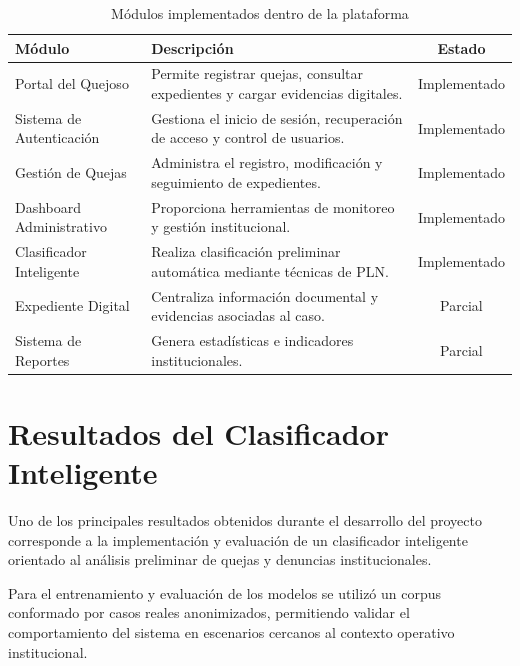 \begin{table}[H]
\centering
\caption{Módulos implementados dentro de la plataforma}
\label{tab:modulos_implementados}
\renewcommand{\arraystretch}{1.4}
\begin{tabularx}{\textwidth}{|p{5cm}|X|c|}
\hline
\textbf{Módulo} & \textbf{Descripción} & \textbf{Estado} \\
\hline

Portal del Quejoso &
Permite registrar quejas, consultar expedientes y cargar evidencias digitales. &
Implementado \\
\hline

Sistema de Autenticación &
Gestiona el inicio de sesión, recuperación de acceso y control de usuarios. &
Implementado \\
\hline

Gestión de Quejas &
Administra el registro, modificación y seguimiento de expedientes. &
Implementado \\
\hline

Dashboard Administrativo &
Proporciona herramientas de monitoreo y gestión institucional. &
Implementado \\
\hline

Clasificador Inteligente &
Realiza clasificación preliminar automática mediante técnicas de PLN. &
Implementado \\
\hline

Expediente Digital &
Centraliza información documental y evidencias asociadas al caso. &
Parcial \\
\hline

Sistema de Reportes &
Genera estadísticas e indicadores institucionales. &
Parcial \\
\hline

\end{tabularx}
\end{table}

\section{Resultados del Clasificador Inteligente}

Uno de los principales resultados obtenidos durante el desarrollo del proyecto corresponde a la implementación y evaluación de un clasificador inteligente orientado al análisis preliminar de quejas y denuncias institucionales.

Para el entrenamiento y evaluación de los modelos se utilizó un corpus conformado por casos reales anonimizados, permitiendo validar el comportamiento del sistema en escenarios cercanos al contexto operativo institucional.

